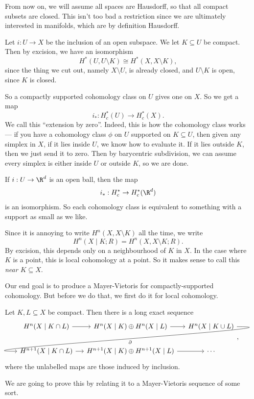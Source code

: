 \documentclass[a4paper]{article}
\theoremstyle{definition}
\begin{document}
From now on, we will assume all spaces are Hausdorff, so that all compact subsets are closed. This isn't too bad a restriction since we are ultimately interested in manifolds, which are by definition Hausdorff.

Let $i: U \to X$ be the inclusion of an open subspace. We let $K \subseteq U$ be compact. Then by excision, we have an isomorphism
\[
  H^*(U, U \setminus K) \cong H^*(X, X \setminus K),
\]
since the thing we cut out, namely $X \setminus U$, is already closed, and $U \setminus K$ is open, since $K$ is closed.

So a compactly supported cohomology class on $U$ gives one on $X$. So we get a map
\[
  i_*: H_c^*(U) \to H_c^*(X).
\]
We call this ``extension by zero''. Indeed, this is how the cohomology class works --- if you have a cohomology class $\phi$ on $U$ supported on $K \subseteq U$, then given any simplex in $X$, if it lies inside $U$, we know how to evaluate it. If it lies outside $K$, then we just send it to zero. Then by barycentric subdivision, we can assume every simplex is either inside $U$ or outside $K$, so we are done.

\begin{eg}
  If $i: U \to \R^d$ is an open ball, then the map
  \[
    i_*: H_c^* \to H_c^*(\R^d)
  \]
  is an isomorphism. So each cohomology class is equivalent to something with a support as small as we like.
\end{eg}

Since it is annoying to write $H^n(X, X \setminus K)$ all the time, we write
\[
  H^n(X\mid K; R) = H^n(X, X \setminus K; R).
\]
By excision, this depends only on a neighbourhood of $K$ in $X$. In the case where $K$ is a point, this is local cohomology at a point. So it makes sense to call this  \emph{near $K \subseteq X$}.

Our end goal is to produce a Mayer-Vietoris for compactly-supported cohomology. But before we do that, we first do it for local cohomology.

\begin{prop}
  Let $K, L \subseteq X$ be compact. Then there is a long exact sequence
  \[
    \begin{tikzcd}[column sep=small]
      H^n(X \mid K \cap L) \ar[r] & H^n(X \mid K) \oplus H^n(X \mid L) \ar[r] & H^n(X \mid K \cup L) \ar[out=0, in=180, overlay, lld, "\partial"]\\
      H^{n + 1}(X \mid K \cap L) \ar[r] & H^{n + 1}(X \mid K) \oplus H^{n + 1}(X \mid L) \ar[r] & \cdots
    \end{tikzcd},
  \]
  where the unlabelled maps are those induced by inclusion.
\end{prop}
We are going to prove this by relating it to a Mayer-Vietoris sequence of some sort.
\end{document}

